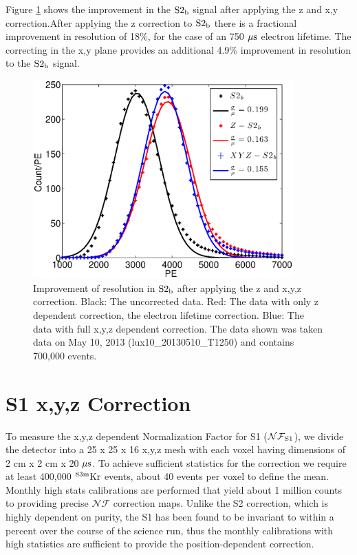 Figure \ref{fig:S2_res} shows the improvement in the $\rm S2_b$ signal after applying the z and x,y correction.After applying the z correction to $\rm S2_b$ there is a fractional improvement in resolution of 18\%, for the case of an 750 $\rm \mu s$ electron lifetime. The correcting in the x,y plane provides an additional 4.9\% improvement in resolution to the $\rm S2_b$ signal. 

\renewcommand{\baselinestretch}{1}
\small\normalsize
\begin{figure}[h!]\centering
\includegraphics[width=100mm]{Chapter_XYZ_Corr/Thesis_Corr_Plots/S2_corr_res.eps}
\caption{Improvement of resolution in $\rm S2_b$ after applying the z and x,y,z correction. Black: The uncorrected data. Red: The data with only z dependent correction, the electron lifetime correction. Blue: The data with full x,y,z dependent correction. The data shown was taken data on May 10, 2013 (lux10\_20130510\_T1250) and contains 700,000 \KrCal events.}
\label{fig:S2_res}
\end{figure}
\renewcommand{\baselinestretch}{2}
\small\normalsize

\section{S1 x,y,z Correction}

To measure the x,y,z dependent Normalization Factor for S1 ($\rm \mathcal{NF}_{S1}$), we divide the detector into a 25 x 25 x 16 x,y,z mesh with each voxel having dimensions of 2 cm x 2 cm x 20 $\rm \mu s$. To achieve sufficient statistics for the correction we require at least 400,000 $\rm^{83m}Kr$ events, about 40 events per voxel to define the mean. Monthly high stats calibrations are performed that yield about 1 million counts to providing precise $\mathcal{NF}$ correction maps. Unlike the S2 correction, which is highly dependent on purity, the S1 has been found to be invariant to within a percent over the course of the science run, thus the monthly calibrations with high statistics are sufficient to provide the position-dependent correction.

